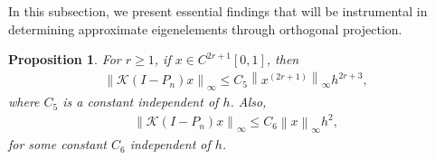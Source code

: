 \documentclass[pdflatex, sn-mathphys-num]{sn-jnl}%
\newcommand{\norm}[1]{\left\lVert #1\right\rVert}
\theoremstyle{thmstyleone}%
\newtheorem{proposition}[theorem]{Proposition}
\theoremstyle{thmstyletwo}%
\theoremstyle{thmstylethree}%
\begin{document}
In this subsection, we present essential findings that will be instrumental in determining approximate eigenelements through orthogonal projection.
\begin{proposition} \label{pro1}
	For $r \geq 1$, if $x \in C^{2r+1}[0,1]$, then
	\begin{eqnarray*}
		\norm{\mathcal{K}(I-P_n)x }_\infty \leq C_5 \norm{x^{(2r+1)}}_{ \infty} h^{2r + 3},
	\end{eqnarray*}
	where $C_5$ is a constant independent of $h$. Also,
	\begin{eqnarray*} 
		\norm{\mathcal{K}(I-P_n)x }_\infty \leq C_6 \norm{x}_\infty h^2,
	\end{eqnarray*}
	for some constant $C_6$ independent of $h$.
\end{proposition}
\end{document}
